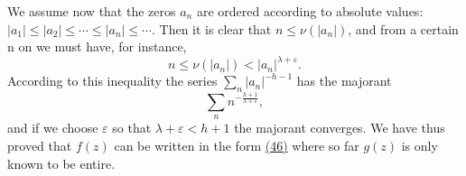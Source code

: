 We assume now that the zeros $a_{n}$ are ordered according to absolute values: $|a_{1}| \leq |a_{2}| \leq \cdots \leq |a_{n}| \leq \cdots$. Then it is clear that $n \leq \nu(|a_{n}|)$, and from a certain n on we must have, for instance,
\begin{equation*}
n \leq \nu (| a _ {n} |) <   | a _ {n} | ^ {\lambda + \varepsilon}.
\end{equation*}
According to this inequality the series $\sum_{n}|a_n|^{-h - 1}$ has the majorant
\begin{equation*}
\sum_ {n} n ^ {- \frac {h + 1}{\lambda + \varepsilon}},
\end{equation*}
and if we choose $\varepsilon$ so that $\lambda + \varepsilon < h + 1$ the majorant converges. We have thus proved that $f(z)$ can be written in the form \hyperref[eq:5.46]{(46)} where so far $g(z)$ is only known to be entire.

